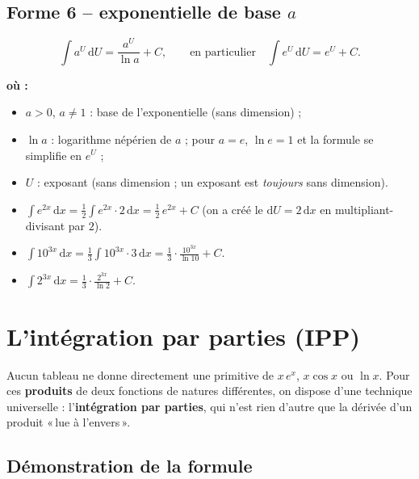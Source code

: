 \documentclass[11pt,a4paper]{article}
\newenvironment{ou}{%
  \par\smallskip\noindent\textbf{où :}\nopagebreak
  \begin{itemize}[leftmargin=1.8em,topsep=2pt,itemsep=1.5pt,parsep=0pt]}%
  {\end{itemize}}
\newcommand{\dd}{\mathrm{d}}
\begin{document}
\subsection{Forme 6 -- exponentielle de base $a$}

\begin{formule}[primitive de $a^U$]
\[
\boxed{\;\int a^{U}\,\dd U=\frac{a^{U}}{\ln a}+C,\qquad\text{en particulier}\quad \int e^{U}\,\dd U=e^{U}+C.\;}
\]
\begin{ou}
  \item $a>0$, $a\neq1$ : base de l'exponentielle (sans dimension) ;
  \item $\ln a$ : logarithme népérien de $a$ ; pour $a=e$, $\ln e=1$ et la formule se simplifie en $e^U$ ;
  \item $U$ : exposant (sans dimension ; un exposant est \emph{toujours} sans dimension).
\end{ou}
\end{formule}

\begin{exemple}[le cas $a=e$ et le cas général]
\begin{itemize}[leftmargin=1.6em,topsep=2pt,itemsep=2pt]
  \item $\displaystyle\int e^{2x}\,\dd x=\frac12\int e^{2x}\cdot 2\,\dd x=\frac12\,e^{2x}+C$
        (on a créé le $\dd U=2\,\dd x$ en multipliant-divisant par $2$).
  \item $\displaystyle\int 10^{3x}\,\dd x=\frac13\int 10^{3x}\cdot 3\,\dd x=\frac13\cdot\frac{10^{3x}}{\ln 10}+C$.
  \item $\displaystyle\int 2^{3x}\,\dd x=\frac13\cdot\frac{2^{3x}}{\ln 2}+C$.
\end{itemize}
\end{exemple}

\section{L'intégration par parties (IPP)}

Aucun tableau ne donne directement une primitive de $x\,e^x$, $x\cos x$ ou $\ln x$. Pour ces
\textbf{produits} de deux fonctions de natures différentes, on dispose d'une technique universelle :
l'\textbf{intégration par parties}, qui n'est rien d'autre que la dérivée d'un produit «\,lue à l'envers\,».

\subsection{Démonstration de la formule}
\end{document}
